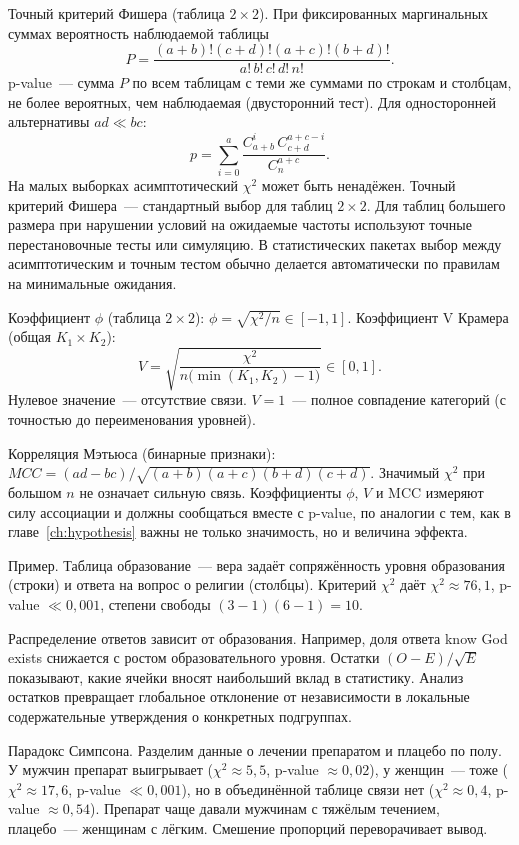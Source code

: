 Точный критерий Фишера (таблица $2\times 2$). При фиксированных маргинальных суммах вероятность наблюдаемой таблицы \[ P=\frac{(a+b)!(c+d)!(a+c)!(b+d)!}{a!\,b!\,c!\,d!\,n!}.
\] p-value~--- сумма $P$ по всем таблицам с теми же суммами по строкам и столбцам, не более вероятных, чем наблюдаемая (двусторонний тест).
Для односторонней альтернативы $ad\ll bc$: \[ p=\sum_{i=0}^{a}\frac{C_{a+b}^{i}\,C_{c+d}^{a+c-i}}{C_n^{a+c}}.
\] На малых выборках асимптотический $\chi^2$ может быть ненадёжен. Точный критерий Фишера~--- стандартный выбор для таблиц $2\times 2$.
Для таблиц большего размера при нарушении условий на ожидаемые частоты используют точные перестановочные тесты или симуляцию. В статистических пакетах выбор между асимптотическим и точным тестом обычно делается автоматически по правилам на минимальные ожидания.

\begin{definition}
Коэффициент $\phi$ (таблица $2\times 2$): $\phi=\sqrt{\chi^2/n}\in[-1,1]$.
Коэффициент V Крамера (общая $K_1\times K_2$): \[ V=\sqrt{\frac{\chi^2}{n\bigl(\min(K_1,K_2)-1\bigr)}}\in[0,1].
\] Нулевое значение~--- отсутствие связи. $V=1$~--- полное совпадение категорий (с точностью до переименования уровней).
\end{definition}

Корреляция Мэтьюса (бинарные признаки): $MCC=(ad-bc)/\sqrt{(a+b)(a+c)(b+d)(c+d)}$.
Значимый $\chi^2$ при большом $n$ не означает сильную связь. Коэффициенты $\phi$, $V$ и MCC измеряют силу ассоциации и должны сообщаться вместе с p-value, по аналогии с тем, как в главе~\ref{ch:hypothesis} важны не только значимость, но и величина эффекта.

Пример. Таблица образование~--- вера задаёт сопряжённость уровня образования (строки) и ответа на вопрос о религии (столбцы).
Критерий $\chi^2$ даёт $\chi^2\approx 76{,}1$, p-value $\ll 0{,}001$, степени свободы $(3-1)(6-1)=10$.

Распределение ответов зависит от образования. Например, доля ответа know God exists снижается с ростом образовательного уровня.
Остатки $(O-E)/\sqrt E$ показывают, какие ячейки вносят наибольший вклад в статистику.
Анализ остатков превращает глобальное отклонение от независимости в локальные содержательные утверждения о конкретных подгруппах.

Парадокс Симпсона. Разделим данные о лечении препаратом и плацебо по полу.
У мужчин препарат выигрывает ($\chi^2\approx 5{,}5$, p-value $\approx 0{,}02$), у женщин~--- тоже ($\chi^2\approx 17{,}6$, p-value $\ll 0{,}001$), но в объединённой таблице связи нет ($\chi^2\approx 0{,}4$, p-value $\approx 0{,}54$).
Препарат чаще давали мужчинам с тяжёлым течением, плацебо~--- женщинам с лёгким. Смешение пропорций переворачивает вывод.

